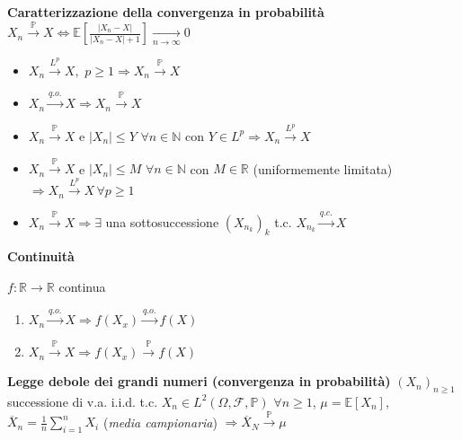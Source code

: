 \documentclass[openany]{book} %
\begin{document}
\textbf{Caratterizzazione della convergenza in probabilità} \quad $X_n\overset {\mathbb{P}}\rightarrow X \Leftrightarrow \mathbb{E}\left[\frac{|X_n-X|}{|X_n-X|+1}\right]\underset {n \rightarrow\infty}\rightarrow 0$

\begin{itemize}

	\item $X_n\overset {L^p} \rightarrow X,$ $p\geq 1 \Rightarrow X_n\overset {\mathbb{P}}\rightarrow X$

	\item $X_n\overset {q.o.} \rightarrow X \Rightarrow X_n\overset {\mathbb{P}}\rightarrow X$

	\item $X_n\overset {\mathbb{P}}\rightarrow X$ e $|X_n|\leq Y$ $\forall n\in \mathbb{N}$ con $Y\in L^p \Rightarrow X_n\overset {L^p}\rightarrow X$

	\item $X_n\overset {\mathbb{P}}\rightarrow X$ e $|X_n|\leq M$ $\forall n\in \mathbb{N}$ con $M\in \mathbb{R}$ (uniformemente limitata) $ \Rightarrow X_n\overset {L^p}\rightarrow X\, \forall p\geq 1$

	\item $X_n\overset {\mathbb{P}}\rightarrow X \Rightarrow \exists$ una sottosuccessione $(X_{n_k})_k$ t.c. $X_{n_k}\overset {q.c.}\rightarrow X$

\end{itemize}

\textbf{Continuità}

$f:\mathbb{R}\rightarrow \mathbb{R}$ continua

\begin{enumerate}[label=({\alph*})]

	\item $X_n\overset {q.o.}\rightarrow X \Rightarrow f(X_x) \overset {q.o.}\rightarrow f(X)$

	\item $X_n\overset {\mathbb{P}}\rightarrow X \Rightarrow f(X_x) \overset {\mathbb{P}}\rightarrow f(X)$

\end{enumerate}

\textbf{Legge debole dei grandi numeri (convergenza in probabilità)} $(X_n)_{n\geq 1}$ successione di v.a. i.i.d. t.c. $X_n\in L^2(\Omega,\mathcal{F},\mathbb{P})$ $\forall n\geq 1$, $\mu=\mathbb{E}[X_n]$, $\overline{X}_n=\frac{1}{n}\sum_{i=1}^nX_i$ (\textit{media campionaria}) $\Rightarrow\overline {X}_N\overset {\mathbb{P}}\rightarrow\mu$
\end{document}
